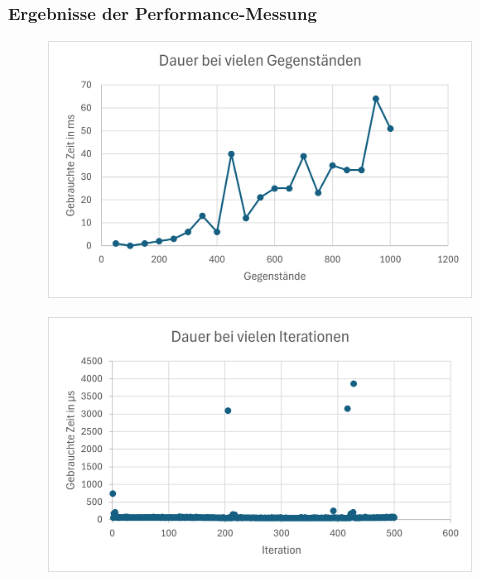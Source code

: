 \subsubsection*{Ergebnisse der Performance-Messung}
\begin{figure}[H]
\centering
\begin{minipage}[b]{0.45\textwidth}
\centering
\includegraphics[width=\textwidth]{images/exclGeg}
\label{fig:exclGeg}
\end{minipage}
\hfill
\begin{minipage}[b]{0.45\textwidth}
\centering
\includegraphics[width=\textwidth]{images/exclIte}
\label{fig:exclIte}
\end{minipage}
\end{figure}

